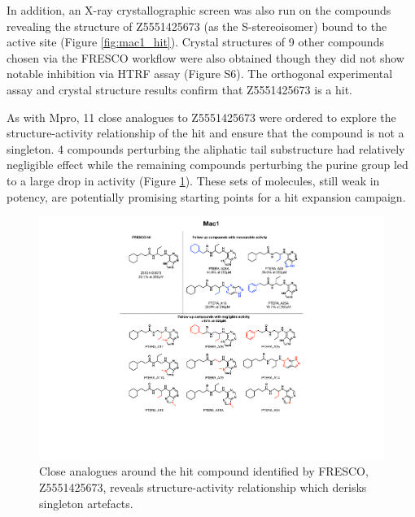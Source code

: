 In addition, an X-ray crystallographic screen was also run on the compounds revealing the structure of Z5551425673 (as the S-stereoisomer) bound to the active site (Figure \ref{fig:mac1_hit}). Crystal structures of 9 other compounds chosen via the FRESCO workflow were also obtained though they did not show notable inhibition via HTRF assay (Figure S6). The orthogonal experimental assay and crystal structure results confirm that Z5551425673 is a hit. 

As with Mpro, 11 close analogues to Z5551425673 were ordered to explore the structure-activity relationship of the hit and ensure that the compound is not a singleton. 4 compounds perturbing the aliphatic tail substructure had relatively negligible effect while the remaining compounds perturbing the purine group led to a large drop in activity (Figure \ref{fig:mac1_rounds}). These sets of molecules, still weak in potency, are potentially promising starting points for a hit expansion campaign. 

\begin{figure}
    \centering
    \includegraphics[width=0.75\linewidth]{Chapters/Fresco/Figs/mac1_rounds.pdf}
    \caption{Close analogues around the hit compound identified by FRESCO, Z5551425673, reveals structure-activity relationship which derisks singleton artefacts.}
    \label{fig:mac1_rounds}
\end{figure}
